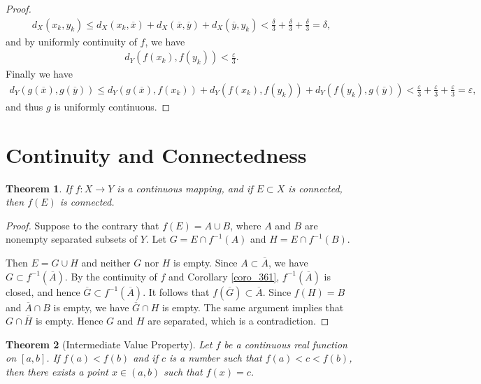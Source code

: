 \documentclass[11pt]{book}
\newtheorem{theorem}{Theorem}[chapter]
\theoremstyle{definition}
\numberwithin{equation}{chapter}
\begin{document}
\begin{proof}
\begin{align*}
    d_X(x_k, y_k) \leq d_X(x_k,\overline{x}) + d_X(\overline{x},\overline{y}) + d_X(\overline{y}, y_k) < \frac{\delta}{3} + \frac{\delta}{3} + \frac{\delta}{3} = \delta,
\end{align*}
and by uniformly continuity of $f$, we have
\begin{align*}
    d_Y(f(x_k), f(y_k)) < \frac{\varepsilon}{3}.
\end{align*}
Finally we have
\begin{align*}
    d_Y(g(\overline{x}),g(\overline{y})) \leq d_Y(g(\overline{x}),f(x_k)) + d_Y(f(x_k), f(y_k)) + d_Y(f(y_k), g(\overline{y})) < \frac{\varepsilon}{3} + \frac{\varepsilon}{3} + \frac{\varepsilon}{3} = \varepsilon,
\end{align*}
and thus $g$ is uniformly continuous.
\end{proof}
 

\medskip


\section{Continuity and Connectedness}

\begin{theorem}\label{th_315}
If $f: X \to Y$ is a continuous mapping, and if $E \subset X$ is connected, then $f(E)$ is connected.
\end{theorem}
\begin{proof}
Suppose to the contrary that $f(E) = A \cup B$, where $A$ and $B$ are nonempty separated subsets of $Y$. Let $G = E \cap f^{-1}(A)$ and $H = E \cap f^{-1}(B)$.

Then $E = G \cup H$ and neither $G$ nor $H$ is empty. Since $A \subset \overline{A}$, we have $G \subset f^{-1}(\overline{A})$. By the continuity of $f$ and Corollary \ref{coro_361}, $f^{-1}(\overline{A})$ is closed, and hence $\overline{G} \subset f^{-1}(\overline{A})$. It follows that $f(\overline{G}) \subset \overline{A}$. Since $f(H) = B$ and $\overline{A} \cap B$ is empty, we have $\overline{G} \cap H$ is empty. The same argument implies that $G \cap \overline{H}$ is empty. Hence $G$ and $H$ are separated, which is a contradiction.
\end{proof}

\medskip

\begin{theorem}[Intermediate Value Property]\label{th_316}
Let $f$ be a continuous real function on $[a,b]$. If $f(a) < f(b)$ and if $c$ is a number such that $f(a) < c < f(b)$, then there exists a point $x \in (a,b)$ such that $f(x) = c$. 
\end{theorem}
\end{document}
